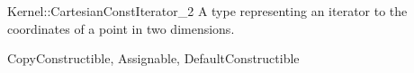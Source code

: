 \begin{ccRefConcept}{Kernel::CartesianConstIterator_2}
A type representing an iterator to the  coordinates of a point
in two dimensions.

\ccRefines
CopyConstructible, Assignable, DefaultConstructible

\ccSeeAlso
{} \\

\end{ccRefConcept}
